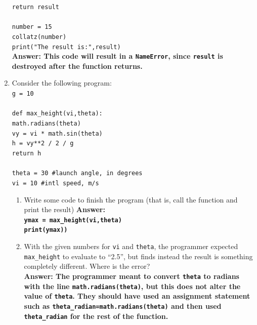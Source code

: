 \documentclass{article}
\begin{document}
\begin{enumerate}
	\null\quad\quad\texttt{return result}\\
	\null\quad\quad\quad\quad\texttt{}\\
	\texttt{number = 15}\\
	\texttt{collatz(number)}\\
	\texttt{print("The result is:",result)}\\
	{\bfseries \color{ForestGreen} Answer: This code will result in a \texttt{NameError}, since \texttt{result} is destroyed after the function returns.}
	\item Consider the following program:\\
	\texttt{g = 10}\\
	\texttt{}\\
	\texttt{def max\_height(vi,theta):}\\
	\null\quad\quad\texttt{math.radians(theta)}\\
	\null\quad\quad\texttt{vy = vi * math.sin(theta)}\\
	\null\quad\quad\texttt{h = vy**2 / 2 / g}\\
	\null\quad\quad\texttt{return h}\\
	\texttt{}\\
	\texttt{theta = 30 \#launch angle, in degrees}\\
	\texttt{vi = 10 \#intl speed, m/s}\\
	\begin{enumerate}
		\item Write some code to finish the program (that is, call the function and print the result)
		{\bfseries \color{ForestGreen} Answer:\\ \texttt{ymax = max\_height(vi,theta)}\\\texttt{print(ymax))}}
		\item With the given numbers for \texttt{vi} and \texttt{theta}, the programmer expected \texttt{max\_height} to evaluate to ``2.5'', but finds instead the result is something completely different. Where is the error?\\
		{\bfseries \color{ForestGreen} Answer: The programmer meant to convert \texttt{theta} to radians with the line \texttt{math.radians(theta)}, but this does not alter the value of \texttt{theta}. They should have used an assignment statement such as \texttt{theta\_radian=math.radians(theta)} and then used \texttt{theta\_radian} for the rest of the function. }
	\end{enumerate}
\end{enumerate}
\end{document}
